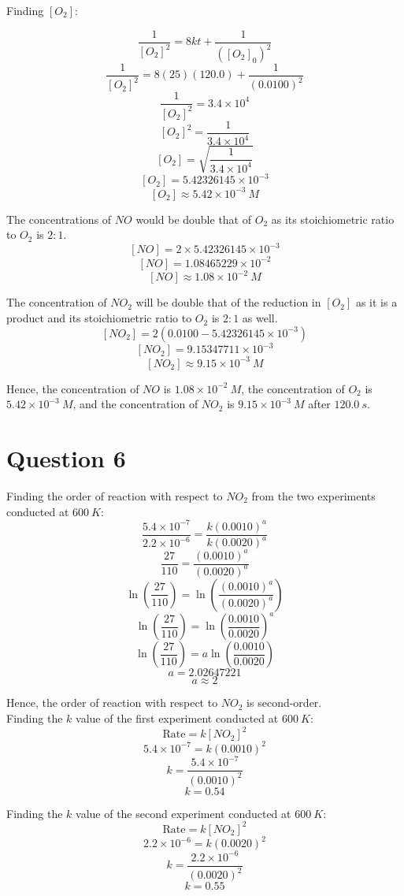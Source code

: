 \documentclass[11pt]{article}
\begin{document}
Finding \([O_2]\):

\[\frac{1}{[O_2]^2} = 8kt + \frac{1}{([O_2]_0)^2}\]
\[\frac{1}{[O_2]^2} = 8(25)(120.0) + \frac{1}{(0.0100)^2}\]
\[\frac{1}{[O_2]^2} = 3.4 \times 10^4\]
\[[O_2]^2 = \frac{1}{3.4 \times 10^4}\]
\[[O_2] = \sqrt{\frac{1}{3.4 \times 10^4}}\]
\[[O_2] = 5.42326145 \times 10^{-3}\]
\[[O_2] \approx 5.42 \times 10^{-3} \ \unit{M}\]

The concentrations of \(NO\) would be double that of \(O_2\) as its stoichiometric ratio to \(O_2\) is \(2:1\).
\[[NO] = 2 \times 5.42326145 \times 10^{-3}\]
\[[NO] = 1.08465229 \times 10^{-2}\]
\[[NO] \approx 1.08 \times 10^{-2} \ \unit{M}\]

The concentration of \(NO_2\) will be double that of the reduction in \([O_2]\) as it is a product and its stoichiometric ratio to \(O_2\) is \(2:1\) as well.
\[[NO_2] = 2(0.0100 - 5.42326145 \times 10^{-3})\]
\[[NO_2] = 9.15347711 \times 10^{-3}\]
\[[NO_2] \approx 9.15 \times 10^{-3} \ \unit{M}\]

Hence, the concentration of \(NO\) is \(1.08 \times 10^{-2} \ \unit{M}\), the concentration of \(O_2\) is \(5.42 \times 10^{-3} \ \unit{M}\), and the concentration of \(NO_2\) is \(9.15 \times 10^{-3} \ \unit{M}\) after \(\qty{120.0}{\unit{s}}\).


\section{Question 6}
\label{sec:orgfa1de93}

Finding the order of reaction with respect to \(NO_2\) from the two experiments conducted at \(\qty{600}{\unit{K}}\):
\[\frac{5.4 \times 10^{-7}}{2.2 \times 10^{-6}} = \frac{k(0.0010)^a}{k(0.0020)^a}\]
\[\frac{27}{110} = \frac{(0.0010)^a}{(0.0020)^a}\]
\[\ln \left(\frac{27}{110} \right) = \ln \left(\frac{(0.0010)^a}{(0.0020)^a} \right)\]
\[\ln \left(\frac{27}{110} \right) = \ln \left(\frac{0.0010}{0.0020} \right)^a\]
\[\ln \left(\frac{27}{110} \right) = a \ln \left(\frac{0.0010}{0.0020} \right)\]
\[a = 2.02647221\]
\[a \approx 2\]

Hence, the order of reaction with respect to \(NO_2\) is second-order.
\\[0pt]

Finding the \(k\) value of the first experiment conducted at \(\qty{600}{\unit{K}}\):
\[\text{Rate} = k[NO_2]^2\]
\[5.4 \times 10^{-7} = k(0.0010)^2\]
\[k = \frac{5.4 \times 10^{-7}}{(0.0010)^2}\]
\[k = 0.54\]

Finding the \(k\) value of the second experiment conducted at \(\qty{600}{\unit{K}}\):
\[\text{Rate} = k[NO_2]^2\]
\[2.2 \times 10^{-6} = k(0.0020)^2\]
\[k = \frac{2.2 \times 10^{-6}}{(0.0020)^2}\]
\[k = 0.55\]
\end{document}
